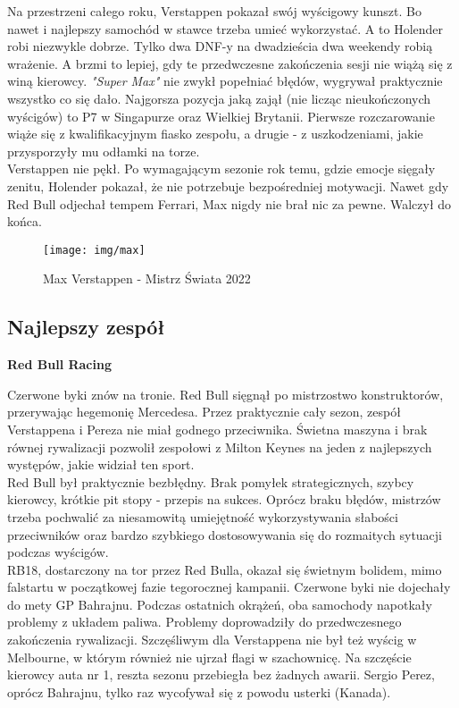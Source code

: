 \documentclass[12pt]{article}
\begin{document}
        Na przestrzeni całego roku, Verstappen pokazał swój wyścigowy kunszt. Bo nawet i najlepszy samochód w stawce trzeba umieć wykorzystać. A to Holender robi niezwykle dobrze. Tylko dwa DNF-y na dwadzieścia dwa weekendy robią wrażenie. A brzmi to lepiej, gdy te przedwczesne zakończenia sesji nie wiążą się z winą kierowcy. \textit{"Super Max"} nie zwykł popełniać błędów, wygrywał praktycznie wszystko co się dało. Najgorsza pozycja jaką zajął (nie licząc nieukończonych wyścigów) to P7 w Singapurze oraz Wielkiej Brytanii. Pierwsze rozczarowanie wiąże się z kwalifikacyjnym fiasko zespołu, a drugie - z uszkodzeniami, jakie przysporzyły mu odłamki na torze.\\

        Verstappen nie pękł. Po wymagającym sezonie rok temu, gdzie emocje sięgały zenitu, Holender pokazał, że nie potrzebuje bezpośredniej motywacji. Nawet gdy Red Bull odjechał tempem Ferrari, Max nigdy nie brał nic za pewne. Walczył do końca.
        
        \begin{figure}[ht]
            \centering
            \texttt{[image: img/max]}
            \caption{Max Verstappen - Mistrz Świata 2022}
            \label{fig:max}
        \end{figure}

    \newpage   
    \subsection{Najlepszy zespół}
        \begin{center}
            \Huge \textbf{Red Bull Racing}
        \end{center}
         Czerwone byki znów na tronie. Red Bull sięgnął po mistrzostwo konstruktorów, przerywając hegemonię Mercedesa. Przez praktycznie cały sezon, zespół Verstappena i Pereza nie miał godnego przeciwnika. Świetna maszyna i brak równej rywalizacji pozwolił zespołowi z Milton Keynes na jeden z najlepszych występów, jakie widział ten sport.\\

        Red Bull był praktycznie bezbłędny. Brak pomyłek strategicznych, szybcy kierowcy, krótkie pit stopy - przepis na sukces. Oprócz braku błędów, mistrzów trzeba pochwalić za niesamowitą umiejętność wykorzystywania słabości przeciwników oraz bardzo szybkiego dostosowywania się do rozmaitych sytuacji podczas wyścigów.\\
        
        RB18, dostarczony na tor przez Red Bulla, okazał się świetnym bolidem, mimo falstartu w początkowej fazie tegorocznej kampanii. Czerwone byki nie dojechały do mety GP Bahrajnu. Podczas ostatnich okrążeń, oba samochody napotkały problemy z układem paliwa. Problemy doprowadziły do przedwczesnego zakończenia rywalizacji. Szczęśliwym dla Verstappena nie był też wyścig w Melbourne, w którym również nie ujrzał flagi w szachownicę. Na szczęście kierowcy auta nr 1, reszta sezonu przebiegła bez żadnych awarii. Sergio Perez, oprócz Bahrajnu, tylko raz wycofywał się z powodu usterki (Kanada).\\
        
\end{document}
